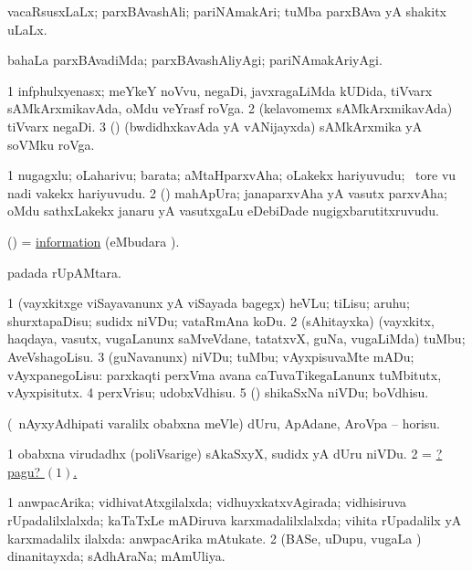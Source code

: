 \bentry
{}
\gl{\gu}
\bmng
vacaRsusxLaLx; parxBAvashAli; pariNAmakAri; tuMba parxBAva yA shakitx uLaLx. 
\emng
\eentry

\bentry
{}
\gl{\kirxvi}
\bmng
bahaLa parxBAvadiMda; parxBAvashAliyAgi; pariNAmakAriyAgi. 
\emng
\eentry

\bentry
{}
\gl{\nA}
\bmng
\bnum
\num{1} infphulxyenasx; meYkeY noVvu, negaDi, javxragaLiMda kUDida, tiVvarx sAMkArxmikavAda, oMdu veYrasf roVga. 
\num{2} (kelavomemx sAMkArxmikavAda) tiVvarx negaDi. 
\num{3} (\rUpa) (bwdidhxkavAda yA vANijayxda) sAMkArxmika yA soVMku roVga. 
\enum
\emng
\eentry

\bentry
{}
\gl{\nA}
\bmng
\bnum
\num{1} nugagxlu; oLaharivu; barata; aMtaHparxvAha; oLakekx hariyuvudu; \kanmu\ tore \mo vu nadi \mo vakekx hariyuvudu. 
\num{2} (\rUpa) mahApUra; janaparxvAha yA vasutx parxvAha; oMdu sathxLakekx janaru yA vasutxgaLu eDebiDade nugigxbarutitxruvudu. 
\enum
\emng
\eentry

 
\bentry
{}
\gl{\nA}
\bmng
(\AmA)  = \hyperlink{information}{information} (eMbudara \saMkiSx). 
\emng
\eentry

\bentry
{}
\gl{\sakirx}
\bmng
{} padada rUpAMtara. 
\emng
\eentry

\bentry
{}
\gl{\sakirx}
\bmng
\bnum
\num{1} (vayxkitxge viSayavanunx yA viSayada bagegx) heVLu; tiLisu; aruhu; shurxtapaDisu; sudidx niVDu; vataRmAna koDu. 
\num{2} (sAhitayxka) (vayxkitx, haqdaya, vasutx, \mo vugaLanunx saMveVdane, tatatxvX, guNa, \mo vugaLiMda) tuMbu; AveVshagoLisu. 
\num{3} (guNavanunx) niVDu; tuMbu; vAyxpisuvaMte mADu; vAyxpanegoLisu:  parxkaqti perxVma avana caTuvaTikegaLanunx tuMbitutx, vAyxpisitutx. 
\num{4} perxVrisu; udobxVdhisu. 
\num{5} (\gaparx) shikaSxNa niVDu; boVdhisu. 
\enum
\emng

\noindent
\gl{\akirx}
\bmng
(\kanmu\ nAyxyAdhipati \mo varalilx obabxna meVle) dUru, ApAdane, AroVpa -- horisu. 
\emng

\noindent
\gl{\pagu}
\bmng
\hypertarget{inform pagu1}{} 
\bnum
\num{1}  obabxna virudadhx (poliVsarige) sAkaSxyX, sudidx yA dUru niVDu. 
\num{2}  = \hyperlink{inform pagu1}{?pagu? \((1)\).} 
\enum
\emng
\eentry

\bentry
{}
\gl{\gu}
\bmng
\bnum
\num{1} anwpacArika; vidhivatAtxgilalxda; vidhuyxkatxvAgirada; vidhisiruva rUpadalilxlalxda; kaTaTxLe mADiruva karxmadalilxlalxda; vihita rUpadalilx yA karxmadalilx ilalxda:  anwpacArika mAtukate. 
\num{2} (BASe, uDupu, \mo vugaLa \vi) dinanitayxda; sAdhAraNa; mAmUliya. 
\enum
\emng
\eentry

